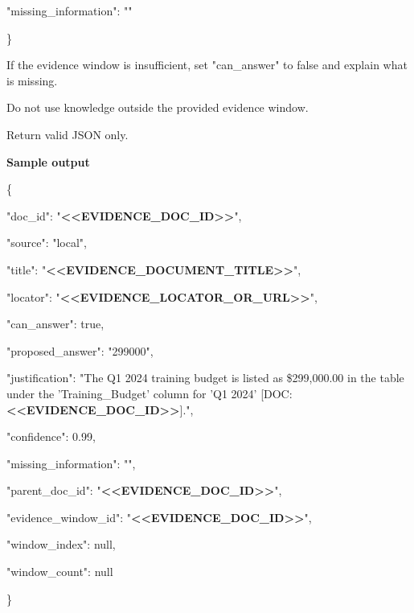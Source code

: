 \begin{tcolorbox}
\begin{scriptsize}
  "missing\_information": ""\par
\}\par
\mbox{}\par
If the evidence window is insufficient, set "can\_answer" to false and explain what is missing.\par
Do not use knowledge outside the provided evidence window.\par
Return valid JSON only.\par
\medskip
\normalfont\textbf{Sample output}\par
\ttfamily
\{\par
  "doc\_id": "\textcolor{my-green}{\textbf{\textless{}\textless{}EVIDENCE\_DOC\_ID\textgreater{}\textgreater{}}}",\par
  "source": "local",\par
  "title": "\textcolor{my-green}{\textbf{\textless{}\textless{}EVIDENCE\_DOCUMENT\_TITLE\textgreater{}\textgreater{}}}",\par
  "locator": "\textcolor{my-green}{\textbf{\textless{}\textless{}EVIDENCE\_LOCATOR\_OR\_URL\textgreater{}\textgreater{}}}",\par
  "can\_answer": true,\par
  "proposed\_answer": "299000",\par
  "justification": "The Q1 2024 training budget is listed as \$299,000.00 in the table under the 'Training\_Budget' column for 'Q1 2024' [DOC:\textcolor{my-green}{\textbf{\textless{}\textless{}EVIDENCE\_DOC\_ID\textgreater{}\textgreater{}}}].",\par
  "confidence": 0.99,\par
  "missing\_information": "",\par
  "parent\_doc\_id": "\textcolor{my-green}{\textbf{\textless{}\textless{}EVIDENCE\_DOC\_ID\textgreater{}\textgreater{}}}",\par
  "evidence\_window\_id": "\textcolor{my-green}{\textbf{\textless{}\textless{}EVIDENCE\_DOC\_ID\textgreater{}\textgreater{}}}",\par
  "window\_index": null,\par
  "window\_count": null\par
\}\par
\end{scriptsize}
\end{tcolorbox}
